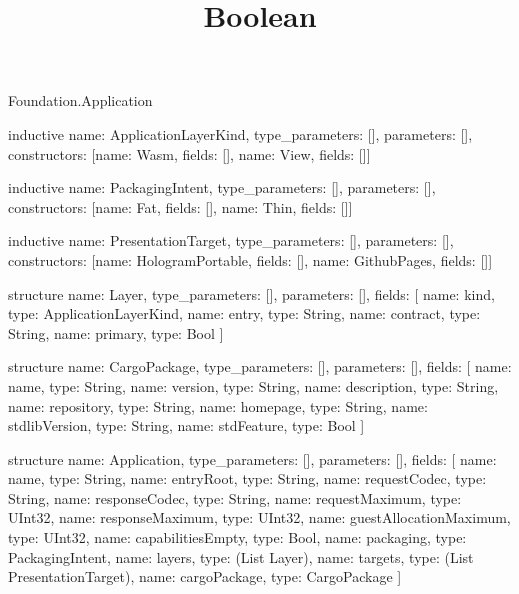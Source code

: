 \begin{lexlean}{Foundation.Application}
\title{Boolean}
\begin{semanticmodule}
inductive{
  name: ApplicationLayerKind,
  type_parameters: [],
  parameters: [],
  constructors: [{name: Wasm, fields: []}, {name: View, fields: []}]
}

inductive{
  name: PackagingIntent,
  type_parameters: [],
  parameters: [],
  constructors: [{name: Fat, fields: []}, {name: Thin, fields: []}]
}

inductive{
  name: PresentationTarget,
  type_parameters: [],
  parameters: [],
  constructors: [{name: HologramPortable, fields: []}, {name: GithubPages, fields: []}]
}

structure{
  name: Layer,
  type_parameters: [],
  parameters: [],
  fields: [
    {name: kind, type: ApplicationLayerKind},
    {name: entry, type: String},
    {name: contract, type: String},
    {name: primary, type: Bool}
  ]
}

structure{
  name: CargoPackage,
  type_parameters: [],
  parameters: [],
  fields: [
    {name: name, type: String},
    {name: version, type: String},
    {name: description, type: String},
    {name: repository, type: String},
    {name: homepage, type: String},
    {name: stdlibVersion, type: String},
    {name: stdFeature, type: Bool}
  ]
}

structure{
  name: Application,
  type_parameters: [],
  parameters: [],
  fields: [
    {name: name, type: String},
    {name: entryRoot, type: String},
    {name: requestCodec, type: String},
    {name: responseCodec, type: String},
    {name: requestMaximum, type: UInt32},
    {name: responseMaximum, type: UInt32},
    {name: guestAllocationMaximum, type: UInt32},
    {name: capabilitiesEmpty, type: Bool},
    {name: packaging, type: PackagingIntent},
    {name: layers, type: (List Layer)},
    {name: targets, type: (List PresentationTarget)},
    {name: cargoPackage, type: CargoPackage}
  ]
}
\end{semanticmodule}
\end{lexlean}
